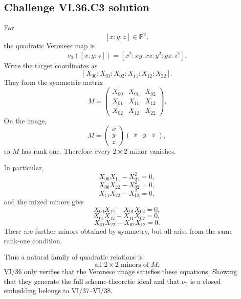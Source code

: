 \subsection*{Challenge VI.36.C3 solution}
\begin{solution}
For
\[
[x:y:z]\in\mathbb P^2,
\]
the quadratic Veronese map is
\[
\nu_2([x:y:z])
=
[x^2:xy:xz:y^2:yz:z^2].
\]
Write the target coordinates as
\[
[X_{00}:X_{01}:X_{02}:X_{11}:X_{12}:X_{22}].
\]
They form the symmetric matrix
\[
M=
\begin{pmatrix}
X_{00}&X_{01}&X_{02}\\
X_{01}&X_{11}&X_{12}\\
X_{02}&X_{12}&X_{22}
\end{pmatrix}.
\]
On the image,
\[
M=
\begin{pmatrix}x\\y\\z\end{pmatrix}
\begin{pmatrix}x&y&z\end{pmatrix},
\]
so \(M\) has rank one. Therefore every \(2\times2\) minor vanishes.

In particular,
\[
X_{00}X_{11}-X_{01}^2=0,
\]
\[
X_{00}X_{22}-X_{02}^2=0,
\]
\[
X_{11}X_{22}-X_{12}^2=0,
\]
and the mixed minors give
\[
X_{00}X_{12}-X_{01}X_{02}=0,
\]
\[
X_{01}X_{12}-X_{11}X_{02}=0,
\]
\[
X_{01}X_{22}-X_{02}X_{12}=0.
\]
There are further minors obtained by symmetry, but all arise from the same rank-one condition.

Thus a natural family of quadratic relations is
\[
\boxed{\text{all }2\times2\text{ minors of }M}.
\]
VI/36 only verifies that the Veronese image satisfies these equations. Showing that they generate the full
scheme-theoretic ideal and that \(\nu_2\) is a closed embedding belongs to VI/37--VI/38.
\end{solution}


